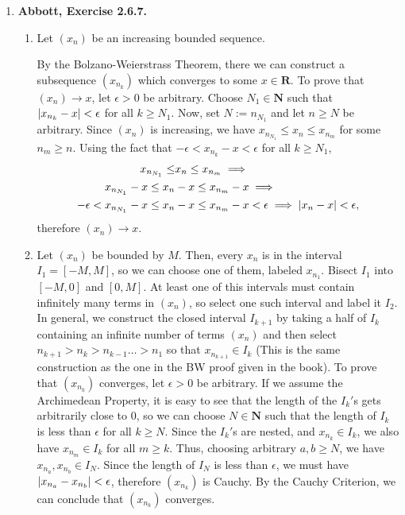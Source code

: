 \documentclass{article}
\DeclarePairedDelimiter\abs{\lvert}{\rvert}
\newcommand{\N}{\mathbf{N}}
\newcommand{\R}{\mathbf{R}}
\newcommand{\exc}[2][Abbott]{\item \textbf{#1, Exercise #2.}}
\newcommand{\lep}[1][L]{#1et $\epsilon > 0$ be arbitrary}
\begin{document}
\begin{enumerate}
\begin{enumerate}
        \item 
    \end{enumerate}
    
    \exc{2.6.7}
    \begin{enumerate}
        \item Let $(x_n)$ be an increasing bounded sequence. 
        
        By the Bolzano-Weierstrass Theorem, there we can construct a subsequence $(x_{n_k})$ which converges to some $x \in \R$. To prove that $(x_n) \to x$, \lep[l]. Choose $N_1 \in \N$ such that $\abs*{x_{n_k}-x} < \epsilon$ for all $k \geq N_1$. Now, set $N := n_{N_1}$ and let $n \geq N$ be arbitrary. Since $(x_n)$ is increasing, we have $x_{n_{N_1}} \leq x_n \leq x_{n_m}$ for some $n_m \geq n$. Using the fact that $-\epsilon< x_{n_k} -x < \epsilon$ for all $k \geq N_1$, 
        \begin{align*}
            x_{n_{N_1}} \leq &x_n \leq x_{n_m} \implies \\
            x_{n_{N_1}}-x \leq x_n&-x \leq x_{n_m}-x \implies \\
            -\epsilon < x_{n_{N_1}}-x \leq x_n&-x \leq x_{n_m}-x < \epsilon \implies
            \abs*{x_n-x} < \epsilon,
        \end{align*} therefore $(x_n) \to x$.
        
        \item Let $(x_n)$ be bounded by $M$. Then, every $x_n$ is in the interval $I_1 = [-M,M]$, so we can choose one of them, labeled $x_{n_1}$. Bisect $I_1$ into $[-M, 0]$ and $[0, M]$. At least one of this intervals must contain infinitely many terms in $(x_n)$, so select one such interval and label it $I_2$. In general, we construct the closed interval $I_{k+1}$ by taking a half of $I_k$ containing an infinite number of terms $(x_n)$ and then select $n_{k+1} > n_k > n_{k-1} \dots > n_1$ so that $x_{n_{k+1}} \in I_k$ (This is the same construction as the one in the BW proof given in the book). To prove that $(x_{n_k})$ converges, \lep[l]. If we assume the Archimedean Property, it is easy to see that the length of the $I_k'$s gets arbitrarily close to $0$, so we can choose $N \in \N$ such that the length of $I_k$ is less than $\epsilon$ for all $k \geq N$. Since the $I_k'$s are nested, and $x_{n_k} \in I_k$, we also have $x_{n_m} \in I_k$ for all $m \geq k$. Thus, choosing arbitrary $a,b \geq N$, we have $x_{n_a},x_{n_b} \in I_N$. Since the length of $I_N$ is less than $\epsilon$, we must have $\abs*{x_{n_a}-x_{n_b}} < \epsilon$, therefore $(x_{n_k})$ is Cauchy. By the Cauchy Criterion, we can conclude that $(x_{n_k})$ converges.
        

\end{enumerate}
\end{enumerate}
\end{document}
